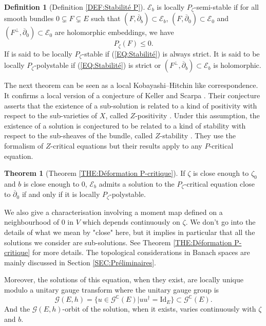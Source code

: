 \documentclass{article}
\theoremstyle{remark}
\theoremstyle{definition}
\newtheorem{theoremIntro}{Theorem}
\newtheorem*{definitionIntro}{Definition}
\newcommand{\C}{\mathbb{C}}
\newcommand{\Id}{\mathrm{Id}}
\newcommand{\E}{\mathcal{E}}
\newcommand{\G}{\mathcal{G}}
\newcommand{\dbar}{\overline{\partial}}
\renewcommand{\leq}{\leqslant}
\begin{document}
\begin{definitionIntro}[Definition \ref{DEF:Stabilité P}]
    $\E_b$ is locally $P_\zeta$-semi-stable if for all smooth bundles $0 \subsetneq F \subsetneq E$ such that $(F,\dbar_b) \subset \E_b$, $(F,\dbar_0) \subset \E_0$ and $(F^\bot,\dbar_0) \subset \E_0$ are holomorphic embeddings, we have
    \begin{equation}\label{EQ:Stabilité}
        P_\zeta(F) \leq 0.
    \end{equation}
    If is said to be locally $P_\zeta$-stable if (\ref{EQ:Stabilité}) is always strict. It is said to be locally $P_\zeta$-polystable if (\ref{EQ:Stabilité}) is strict or $(F^\bot,\dbar_b) \subset \E_b$ is holomorphic.
\end{definitionIntro}

The next theorem can be seen as a local Kobayashi--Hitchin like correspondence. It confirms a local version of a conjecture of Keller and Scarpa \cite[Conjecture 1.4]{Keller_Scarpa}. Their conjecture asserts that the existence of a sub-solution is related to a kind of positivity with respect to the sub-varieties of $X$, called $Z$-positivity \cite[Definition 1.2]{Keller_Scarpa}. Under this assumption, the existence of a solution is conjectured to be related to a kind of stability with respect to the sub-sheaves of the bundle, called $Z$-stability \cite[Definition 1.2]{Keller_Scarpa}. They use the formalism of $Z$-critical equations but their results apply to any $P$-critical equation.

\begin{theoremIntro}[Theorem \ref{THE:Déformation P-critique}]\label{THE:2}
    If $\zeta$ is close enough to $\zeta_0$ and $b$ is close enough to $0$, $\E_b$ admits a solution to the $P_\zeta$-critical equation close to $\dbar_0$ if and only if it is locally $P_\zeta$-polystable.
\end{theoremIntro}

We also give a characterisation involving a moment map defined on a neighbourhood of $0$ in $V$ which depends continuously on $\zeta$. We don't go into the details of what we mean by "close" here, but it implies in particular that all the solutions we consider are sub-solutions. See Theorem \ref{THE:Déformation P-critique} for more details. The topological considerations in Banach spaces are mainly discussed in Section \ref{SEC:Préliminaires}.

Moreover, the solutions of this equation, when they exist, are locally unique modulo a unitary gauge transform where the unitary gauge group is
$$
\G(E,h) = \{u \in \G^\C(E)|uu^\dagger = \Id_E\} \subset \G^\C(E).
$$
And the $\G(E,h)$-orbit of the solution, when it exists, varies continuously with $\zeta$ and $b$.
\end{document}
